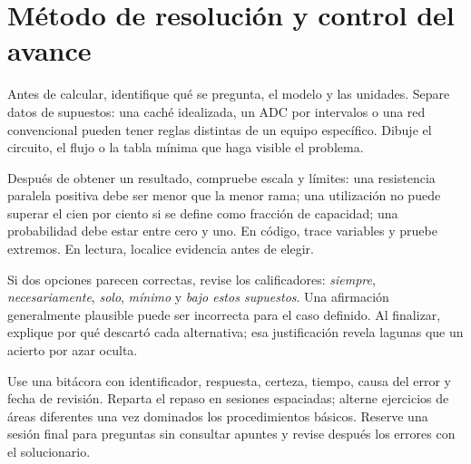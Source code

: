 \section{Método de resolución y control del avance}
Antes de calcular, identifique qué se pregunta, el modelo y las unidades. Separe datos de supuestos: una caché idealizada, un ADC por intervalos o una red convencional pueden tener reglas distintas de un equipo específico. Dibuje el circuito, el flujo o la tabla mínima que haga visible el problema.

Después de obtener un resultado, compruebe escala y límites: una resistencia paralela positiva debe ser menor que la menor rama; una utilización no puede superar el cien por ciento si se define como fracción de capacidad; una probabilidad debe estar entre cero y uno. En código, trace variables y pruebe extremos. En lectura, localice evidencia antes de elegir.

Si dos opciones parecen correctas, revise los calificadores: \emph{siempre}, \emph{necesariamente}, \emph{solo}, \emph{mínimo} y \emph{bajo estos supuestos}. Una afirmación generalmente plausible puede ser incorrecta para el caso definido. Al finalizar, explique por qué descartó cada alternativa; esa justificación revela lagunas que un acierto por azar oculta.

Use una bitácora con identificador, respuesta, certeza, tiempo, causa del error y fecha de revisión. Reparta el repaso en sesiones espaciadas; alterne ejercicios de áreas diferentes una vez dominados los procedimientos básicos. Reserve una sesión final para preguntas sin consultar apuntes y revise después los errores con el solucionario.
